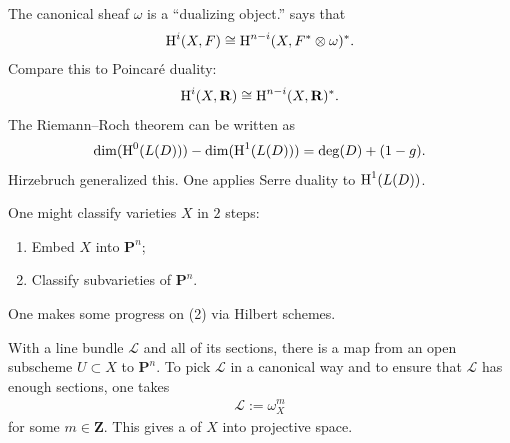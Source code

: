 \documentclass [11 pt, oneside] {article}
\begin{document}
\begin{example}\label{}\text{}
The canonical sheaf $\omega$ is a ``dualizing object.''  says that
\begin{align*}
	\operatorname{H}^i(X,\relax{F}) \cong \operatorname{H}^{n-i} (X, \relax{F}^* \otimes \omega)^*.
\end{align*}
Compare this to Poincar\'e duality:
\begin{align*}
	\operatorname{H}^i(X,\mathbf{R}) \cong \operatorname{H}^{n-i}(X,\mathbf{R})^*.
\end{align*}
The Riemann--Roch theorem can be written as
\begin{align*}
	\dim(\operatorname{H}^0(\relax{L}(D)))- \dim(\operatorname{H}^1(\relax{L}(D))) = \deg (D) +  ( 1-g).
\end{align*}
Hirzebruch generalized this. One applies Serre duality to $\operatorname{H}^1(\relax{L}(D))$. 
\end{example}

\begin{example}[ ]\label{}\text{}
One might classify varieties $X$ in $2$ steps:
\begin{enumerate}
	\item Embed $X$ into $\mathbf{P}^n$;
	\item Classify subvarieties of $\mathbf{P}^n$.
\end{enumerate}
One makes some progress on (2) via Hilbert schemes. 

With a line bundle $\mathscr{L}$ and all of its sections, there is a map from an open subscheme $U\subset X$ to $\mathbf{P}^n$. To pick $\mathscr{L}$ in a canonical way and to ensure that $\mathscr{L}$ has enough sections, one takes 
\begin{align*}
	\mathscr{L}:= \omega_X^m
\end{align*}
for some $m\in \mathbf{Z}$. This gives a  of $X$ into projective space.
\end{example}
\end{document}
